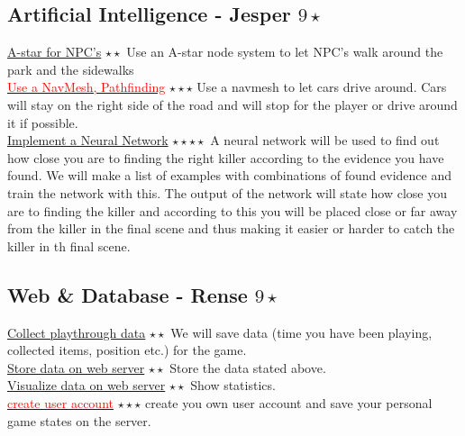 \documentclass{article}
\begin{document}
		\subsection{Artificial Intelligence - Jesper $9 \star$}
			\underline{A-star for NPC's} $\star \star$ Use an A-star node system to let NPC's walk around the park and the sidewalks\\
			\underline {\textcolor{red}{Use a NavMesh, Pathfinding}} $\star \star \star$ Use a navmesh to let cars drive around. Cars will stay on the right side of the road and will stop for the player or drive around it if possible.\\
			\underline{Implement a Neural Network} $\star \star \star \star$ A neural network will be used to find out how close you are to finding the right killer according to the evidence you have found. We will make a list of examples with combinations of found evidence and train the network with this. The output of the network will state how close you are to finding the killer and according to this you will be placed close or far away from the killer in the final scene and thus making it easier or harder to catch the killer in th final scene.
		\subsection{Web \& Database - Rense $9 \star$}
			\underline{Collect playthrough data} $\star \star$ We will save data (time you have been playing, collected items, position etc.) for the game. \\
			\underline{Store data on web server} $\star \star$ Store the data stated above. \\
			\underline{Visualize data on web server} $\star \star$ Show statistics. \\
			\underline {\textcolor{red}{create user account}} $\star \star \star$ create you own user account and save your personal game states on the server. \\
			
\end{document}
